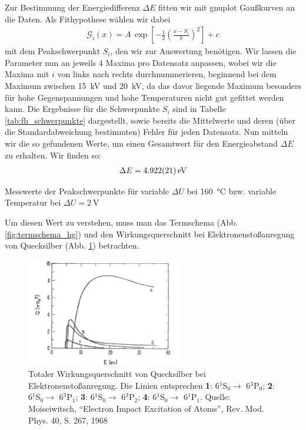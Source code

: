 \documentclass[11pt, a4paper]{article}
\begin{document}
Zur Bestimmung der Energiedifferenz $\Delta E$ fitten wir mit gnuplot Gaußkurven an die Daten.
Als Fithypothese wählen wir dabei
\begin{align*}
\mathcal{G}_i(x)=A\,\exp\left[-\frac{1}{2}\left(\frac{x-S_i}{b}\right)^2\right] + c
\end{align*}
mit dem Peakschwerpunkt $S_i$, den wir zur Auswertung benötigen.
Wir lassen die Parameter nun an jeweils 4 Maxima pro Datensatz anpassen, wobei wir die Maxima mit $i$ von links nach rechts durchnummerieren, beginnend bei dem Maximum zwischen \SI{15}{\kilo\volt} und \SI{20}{\kilo\volt}, da das davor liegende Maximum besonders für hohe Gegenspannungen und hohe Temperaturen nicht gut gefittet werden kann.
Die Ergebnisse für die Schwerpunkte $S_i$ sind in Tabelle \ref{tab:fh_schwerpunkte} dargestellt, sowie bereits die Mittelwerte und deren (über die Standardabweichung bestimmten) Fehler für jeden Datensatz.
Nun mitteln wir die so gefundenen Werte, um einen Gesamtwert für den Energieabstand $\Delta E$ zu erhalten.
Wir finden so:
\begin{align*}
\Delta E = \SI{4.922+-0.021}{\electronvolt}
\end{align*}
\begin{table}[h]
\centering
\resizebox{\columnwidth}{!}{%
}
\caption{Messwerte der Peakschwerpunkte für variable $\Delta U$ bei \SI{160}{\degreeCelsius} bzw. variable Temperatur bei $\Delta U=\SI{2}{\volt}$}
\label{tab:fh_schwerpunkte}
\end{table}
Um diesen Wert zu verstehen, muss man das Termschema (Abb. \ref{fig:termschema_hg}) und den Wirkungsquerschnitt bei Elektronenstoßanregung von Quecksilber (Abb. \ref{fig:wirkungsquerschnitt_hg}) betrachten.
\begin{figure}[h]
\centering
\includegraphics[width=0.6\textwidth]{./figures/wirkungsquerschnitt_hg.pdf}
\caption{Totaler Wirkungsquerschnitt von Quecksilber bei Elektronenstoßanregung. Die Linien entsprechen \textbf{1}: 6$^1$S$_0 \rightarrow$ 6$^3$P$_0$; \textbf{2}: 6$^1$S$_0 \rightarrow$ 6$^3$P$_1$; \textbf{3}: 6$^1$S$_0 \rightarrow$ 6$^3$P$_2$; \textbf{4}: 6$^1$S$_0 \rightarrow$ 6$^1$P$_1$. Quelle: Moiseiwitsch,
"`Electron Impact Excitation of Atoms"', Rev. Mod. Phys. 40, S. 267, 1968}
\label{fig:wirkungsquerschnitt_hg}
\end{figure}
\end{document}
